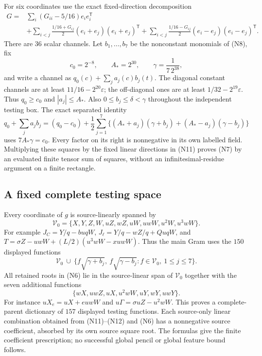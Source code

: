 \documentclass[11pt]{article}
\newcommand{\eps}{\varepsilon}
\begin{document}
For six coordinates use the exact fixed-direction decomposition
\[
\begin{split}
 G={}&\sum_i(G_{ii}-5/16)e_ie_i^{\mathsf T}\\
 &+\sum_{i<j}\frac{1/16+G_{ij}}2(e_i+e_j)(e_i+e_j)^{\mathsf T}
 +\sum_{i<j}\frac{1/16-G_{ij}}2(e_i-e_j)(e_i-e_j)^{\mathsf T}.
\end{split}                                                    \tag{N11}
\]
There are $36$ scalar channels. Let $b_1,\ldots,b_7$ be the
nonconstant monomials of (N8), fix
\[
 c_0=2^{-8},\qquad A_*=2^{30},\qquad
 \gamma=\frac1{7\,2^{38}},
\]
and write a channel as $q_0(c)+\sum_j a_j(c)b_j(t)$.
The diagonal constant channels are at least $11/16-2^{20}\eps$;
the off-diagonal ones are at least $1/32-2^{19}\eps$.
Thus $q_0\ge c_0$ and $|a_j|\le A_*$. Also
$0\le b_j\le\delta<\gamma$ throughout the independent testing box.
The exact separated identity
\[
 q_0+\sum_ja_jb_j=(q_0-c_0)
 +\frac12\sum_{j=1}^7
 \{(A_*+a_j)(\gamma+b_j)+(A_*-a_j)(\gamma-b_j)\}       \tag{N12}
\]
uses $7A_*\gamma=c_0$. Every factor on its right is nonnegative
in its own labelled field. Multiplying these squares by the fixed
linear directions in (N11) proves (N7) by an evaluated finite
tensor sum of squares, without an infinitesimal-residue argument
on a finite rectangle.

\subsection{A fixed complete testing space}

Every coordinate of $g$ is source-linearly spanned by
\[
 \mathcal V_0=\{X,Y,Z,W,uZ,wZ,uW,uwW,u^2W,u^3wW\}.       \tag{N13}
\]
For example $J_C=Y/q-buqW$, $J_\ell=Y/q-wZ/q+QuqW$,
and $T=\sigma Z-uwW+(L/2)(u^3wW-xuwW)$.
Thus the main Gram uses the $150$ displayed functions
\[
 \mathcal V_0\ \cup\
 \{f\sqrt{\gamma+b_j},\ f\sqrt{\gamma-b_j}:
                         f\in\mathcal V_0,\ 1\le j\le7\}.      \tag{N14}
\]
All retained roots in (N6) lie in the source-linear span of
$\mathcal V_0$ together with the seven additional functions
\[
       \{wX,uwZ,uX,u^2wW,uY,wY,uwY\}.                     \tag{N15}
\]
For instance $uX_e=uX+euwW$ and
$u\Gamma=\sigma uZ-u^2wW$. This proves a complete-parent
dictionary of $157$ displayed testing functions. Each source-only
linear combination obtained from (N11)--(N12) and (N6) has a
nonnegative source coefficient, absorbed by its own source square
root. The formulas give the finite coefficient prescription; no
successful global pencil or global feature bound follows.
\end{document}
